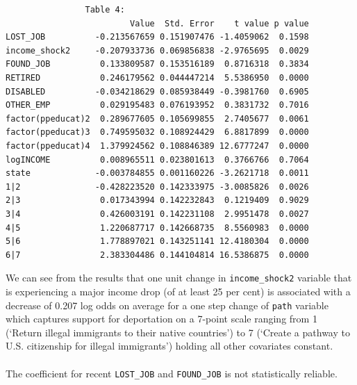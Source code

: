 \documentclass[12pt,letterpaper]{article}
\begin{document}
\begin{Verbatim}
				Table 4:
                         Value  Std. Error    t value p value
LOST_JOB          -0.213567659 0.151907476 -1.4059062  0.1598
income_shock2     -0.207933736 0.069856838 -2.9765695  0.0029
FOUND_JOB          0.133809587 0.153516189  0.8716318  0.3834
RETIRED            0.246179562 0.044447214  5.5386950  0.0000
DISABLED          -0.034218629 0.085938449 -0.3981760  0.6905
OTHER_EMP          0.029195483 0.076193952  0.3831732  0.7016
factor(ppeducat)2  0.289677605 0.105699855  2.7405677  0.0061
factor(ppeducat)3  0.749595032 0.108924429  6.8817899  0.0000
factor(ppeducat)4  1.379924562 0.108846389 12.6777247  0.0000
logINCOME          0.008965511 0.023801613  0.3766766  0.7064
state             -0.003784855 0.001160226 -3.2621718  0.0011
1|2               -0.428223520 0.142333975 -3.0085826  0.0026
2|3                0.017343994 0.142232843  0.1219409  0.9029
3|4                0.426003191 0.142231108  2.9951478  0.0027
4|5                1.220687717 0.142668735  8.5560983  0.0000
5|6                1.778897021 0.143251141 12.4180304  0.0000
6|7                2.383304486 0.144104814 16.5386875  0.0000
\end{Verbatim}
We can see from the results that one unit change in \texttt{income\_shock2} variable that is experiencing a major income drop (of at least 25 per cent) is associated with a decrease of 0.207 log odds on average for a one step change of \texttt{path} variable which captures support for deportation on a 7-point scale ranging from 1 (‘Return illegal immigrants to their native countries’) to 7 (‘Create a pathway to U.S. citizenship for illegal immigrants’) holding all other covariates constant.\\
\\The coefficient for recent \texttt{LOST\_JOB} and \texttt{FOUND\_JOB} is not statistically reliable.\\

\pagebreak
\end{document}

